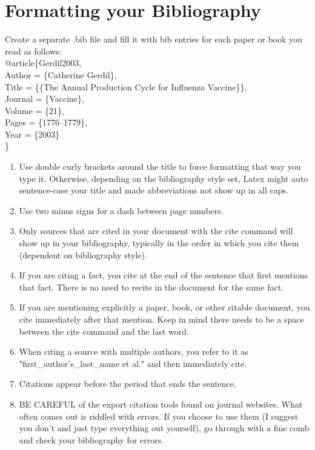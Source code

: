 \chapter{Formatting your Bibliography}\label{Ch:formatting_your_bibliography}

Create a separate .bib file and fill it with bib entries for each paper or book you read as follows:\\

\noindent @article\{Gerdil2003,\\
	Author = \{Catherine Gerdil\},\\
	Title = \{\{The Annual Production Cycle for Influenza Vaccine\}\},\\
	Journal = \{Vaccine\},\\
	Volume = \{21\},\\
	Pages = \{1776--1779\},\\
	Year = \{2003\}\\
	\}


\begin{enumerate}{}
\item Use double curly brackets around the title to force formatting that way you type it. Otherwise, depending on the bibliography style set, Latex might auto sentence-case your title and made abbreviations not show up in all caps. 
\item Use two minus signs for a dash between page numbers.
\item Only sources that are cited in your document with the cite command will show up in your bibliography, typically in the order in which you cite them (dependent on bibliography style).
\item If you are citing a fact, you cite at the end of the sentence that first mentions that fact. There is no need to recite in the document for the same fact.
\item If you are mentioning explicitly a paper, book, or other citable document, you cite immediately after that mention. Keep in mind there needs to be a space between the cite command and the last word. 
\item When citing a source with multiple authors, you refer to it as "first\_author's\_last\_name et al." and then immediately cite.
\item Citations appear before the period that ends the sentence. 
\item BE CAREFUL of the export citation tools found on journal websites. What often comes out is riddled with errors. If you choose to use them (I suggest you don't and just type everything out yourself), go through with a fine comb and check your bibliography for errors. 
\end{enumerate}


\endinput